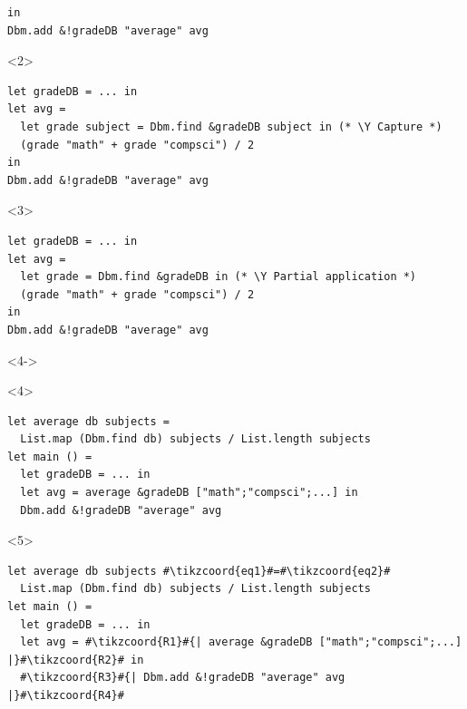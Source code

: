 \documentclass[aspectratio=169,dvipsnames,svgnames,10pt]{beamer}
\newcommand\Y{{\color{Green}{\ding{52}}}}
\begin{document}
\begin{frame}[fragile]
\begin{onlyenv}
\begin{verbatim}
in
Dbm.add &!gradeDB "average" avg
\end{verbatim}
  \end{onlyenv}
  \begin{onlyenv}<2>
\begin{verbatim}
let gradeDB = ... in
let avg =
  let grade subject = Dbm.find &gradeDB subject in (* \Y Capture *)
  (grade "math" + grade "compsci") / 2
in
Dbm.add &!gradeDB "average" avg
\end{verbatim}
  \end{onlyenv}
  \begin{onlyenv}<3>
\begin{verbatim}
let gradeDB = ... in
let avg =
  let grade = Dbm.find &gradeDB in (* \Y Partial application *)
  (grade "math" + grade "compsci") / 2
in
Dbm.add &!gradeDB "average" avg
\end{verbatim}
  \end{onlyenv}
  \begin{onlyenv}<4->
    \begin{onlyenv}<4>%
\begin{verbatim}
let average db subjects = 
  List.map (Dbm.find db) subjects / List.length subjects
let main () =
  let gradeDB = ... in
  let avg = average &gradeDB ["math";"compsci";...] in
  Dbm.add &!gradeDB "average" avg
\end{verbatim}
    \end{onlyenv}%
    \begin{onlyenv}<5>%
\begin{verbatim}
let average db subjects #\tikzcoord{eq1}#=#\tikzcoord{eq2}#
  List.map (Dbm.find db) subjects / List.length subjects
let main () =
  let gradeDB = ... in
  let avg = #\tikzcoord{R1}#{| average &gradeDB ["math";"compsci";...] |}#\tikzcoord{R2}# in
  #\tikzcoord{R3}#{| Dbm.add &!gradeDB "average" avg |}#\tikzcoord{R4}#
\end{verbatim}
    \end{onlyenv}%
  \end{onlyenv}%
\end{frame}
\end{document}
